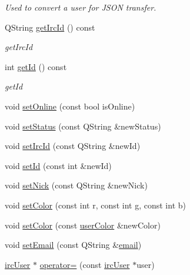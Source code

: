 \begin{DoxyCompactItemize}
\begin{DoxyCompactList}\small\item\em Used to convert a user for J\-S\-O\-N transfer. \end{DoxyCompactList}\item 
Q\-String \hyperlink{classserver_1_1irc_user_adfd348f6686b4e96e94f289d10a13cd5}{get\-Irc\-Id} () const 
\begin{DoxyCompactList}\small\item\em get\-Irc\-Id \end{DoxyCompactList}\item 
int \hyperlink{classserver_1_1irc_user_a7d729b6e71c3f381a1db0cec57520c39}{get\-Id} () const 
\begin{DoxyCompactList}\small\item\em get\-Id \end{DoxyCompactList}\item 
void \hyperlink{classserver_1_1irc_user_a692aec882619dc575ac64ec8fabf02e9}{set\-Online} (const bool is\-Online)
\item 
void \hyperlink{classserver_1_1irc_user_afb3f6602401d493fb06fc48973123bf9}{set\-Status} (const Q\-String \&new\-Status)
\item 
void \hyperlink{classserver_1_1irc_user_a2581bbd3f9bb0db6a1bee2c58b8b21aa}{set\-Irc\-Id} (const Q\-String \&new\-Id)
\item 
void \hyperlink{classserver_1_1irc_user_ad855efa6ab1fe94c35c992ac5cfd164d}{set\-Id} (const int \&new\-Id)
\item 
void \hyperlink{classserver_1_1irc_user_a2002c82125ebd8502ec385e516bfa445}{set\-Nick} (const Q\-String \&new\-Nick)
\item 
void \hyperlink{classserver_1_1irc_user_ae4669a1a72c600a7a238bc39cbd853ca}{set\-Color} (const int r, const int g, const int b)
\item 
void \hyperlink{classserver_1_1irc_user_af0283ebe2bb3ea47e56ea440c9c4ce1c}{set\-Color} (const \hyperlink{structserver_1_1irc_user_1_1user_color}{user\-Color} \&new\-Color)
\item 
void \hyperlink{classserver_1_1irc_user_a8a8c4f9d36cf2572239b5b49b794f8c7}{set\-Email} (const Q\-String \&\hyperlink{classserver_1_1irc_user_aeadaf50889cd947cb5080cb9fe0707bd}{email})
\item 
\hyperlink{classserver_1_1irc_user}{irc\-User} $\ast$ \hyperlink{classserver_1_1irc_user_a31a361c1984e271529a94ce2034a7ba7}{operator=} (const \hyperlink{classserver_1_1irc_user}{irc\-User} $\ast$user)
\end{DoxyCompactItemize}

